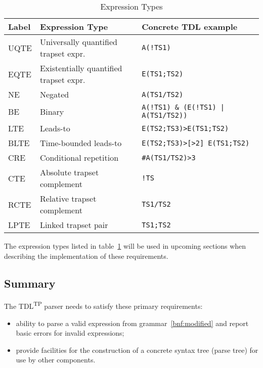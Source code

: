 \documentclass[12pt,oneside,a4paper,notitlepage]{report}
\newcommand{\texttilde}{\raisebox{0.5ex}{\texttildelow}}
\begin{document}
	\begin{table}[h]
		\caption{Expression Types}
		\centering
		\begin{tabular}{l l l}
			\hline
			Label 	& Expression Type						& Concrete TDL example \\
			\hline
			UQTE	& Universally quantified trapset expr.		& \texttt{A(!TS1)} \\
			EQTE 	& Existentially quantified trapset expr.	& \texttt{E(TS1;TS2)} \\
			NE 		& Negated 									& \texttt{\texttilde A(TS1/TS2)} \\
			BE 		& Binary 									& \texttt{A(!TS1) \& (E(!TS1) | A(TS1/TS2))} \\
			LTE 	& Leads-to 									& \texttt{E(TS2;TS3)\texttilde\textgreater E(TS1;TS2)} \\
			BLTE 	& Time-bounded leads-to						& \texttt{E(TS2;TS3)\texttilde\textgreater [\textgreater 2] E(TS1;TS2)} \\
			CRE 	& Conditional repetition 					& \texttt{\#A(TS1/TS2)\textgreater 3} \\
			CTE 	& Absolute trapset complement				& \texttt{!TS} \\
			RCTE 	& Relative trapset complement				& \texttt{TS1/TS2} \\
			LPTE 	& Linked trapset pair 						& \texttt{TS1;TS2} \\
		\end{tabular}
		\label{tbl:expr-types}
	\end{table}

	\bigskip

	\par The expression types listed in table~\ref{tbl:expr-types} will be used in upcoming sections when describing the implementation of these requirements.

	\subsection*{Summary}
	\par The TDL\textsuperscript{TP} parser needs to satisfy these primary requirements:
	\begin{itemize}
		\item ability to parse a valid expression from grammar~\ref{bnf:modified} and report basic errors for invalid expressions;
		\item provide facilities for the construction of a concrete syntax tree (parse tree) for use by other components. 
	\end{itemize}
\end{document}
